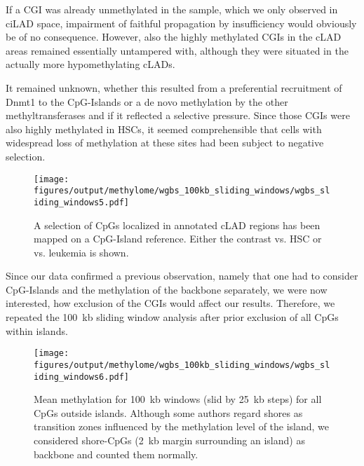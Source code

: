  If a CGI was already unmethylated in the \dnmtwt sample, which we only observed in ciLAD space, impairment of faithful propagation by  insufficiency would obviously be of no consequence. However, also the highly methylated CGIs in the cLAD areas remained essentially untampered with, although they were situated in the actually more hypomethylating cLADs. 
 
 It remained unknown, whether this resulted from a preferential recruitment of Dnmt1 to the CpG-Islands or a de novo methylation by the other methyltransferases and if it reflected a selective pressure. Since those CGIs were also highly methylated in \dnmtwt HSCs, it seemed comprehensible that cells with widespread loss of methylation at these sites had been subject to negative selection. 

\begin{figure}[!htb] 
	\centering
	\texttt{[image: figures/output/methylome/wgbs\_100kb\_sliding\_windows/wgbs\_sliding\_windows5.pdf]} 
	\caption[Scatterplot of CGI methylation in cLADs, \dnmtwt vs. \dnmtchip leukemia and HSCs]{A selection of CpGs localized in annotated cLAD regions has been mapped on a CpG-Island reference. Either the contrast \dnmtwt \kitpos vs. HSC or vs. \dnmtchip \kitpos leukemia is shown.}
	\label{fig:wgbs_sliding_windows5}
\end{figure}

Since our data confirmed a previous observation, namely that one had to consider CpG-Islands and the methylation of the backbone separately\cite{Lee2015}, we were now interested, how exclusion of the CGIs would affect our results. Therefore, we repeated the \SI{100}{\kilo b} sliding window analysis after prior exclusion of all CpGs within islands. 

\begin{figure}[!htb] 
	\centering
	\texttt{[image: figures/output/methylome/wgbs\_100kb\_sliding\_windows/wgbs\_sliding\_windows6.pdf]} 
	\caption[Scatterplot of \SI{100}{\kilo b} analysis with the exception of CGIs]{Mean methylation for \SI{100}{\kilo b} windows (slid by \SI{25}{\kilo b} steps) for all CpGs outside islands.  Although some authors regard shores as transition zones influenced by the methylation level of the island\cite{Hebestreit2013}, we considered shore-CpGs (\SI{2}{\kilo b} margin surrounding an island) as backbone and counted them normally.}
	\label{fig:wgbs_sliding_windows6}
\end{figure}

